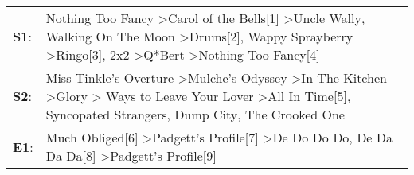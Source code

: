 \begin{supertabular}{p{0.03\textwidth}p{0.92\textwidth}}
 \textbf{S1}:  &  Nothing Too Fancy\textsuperscript{} \textgreater \enspace Carol of the Bells[1]\textsuperscript{} \textgreater \enspace Uncle Wally\textsuperscript{}, \enspace Walking On The Moon\textsuperscript{} \textgreater \enspace Drums[2]\textsuperscript{}, \enspace Wappy Sprayberry\textsuperscript{} \textgreater \enspace Ringo[3]\textsuperscript{}, \enspace 2x2\textsuperscript{} \textgreater \enspace Q*Bert\textsuperscript{} \textgreater \enspace Nothing Too Fancy[4]\textsuperscript{}  \enspace  \\
 \textbf{S2}:  &                              Miss Tinkle's Overture\textsuperscript{} \textgreater \enspace Mulche's Odyssey\textsuperscript{} \textgreater \enspace In The Kitchen\textsuperscript{} \textgreater \enspace Glory\textsuperscript{} \textgreater {} Ways to Leave Your Lover\textsuperscript{} \textgreater \enspace All In Time[5]\textsuperscript{}, \enspace Syncopated Strangers\textsuperscript{}, \enspace Dump City\textsuperscript{}, \enspace The Crooked One\textsuperscript{}  \enspace  \\
 \textbf{E1}:  &                                                                                                                                                                                                                                                                   Much Obliged[6]\textsuperscript{} \textgreater \enspace Padgett's Profile[7]\textsuperscript{} \textgreater \enspace De Do Do Do, De Da Da Da[8]\textsuperscript{} \textgreater \enspace Padgett's Profile[9]\textsuperscript{}  \enspace  \\
\end{supertabular}
